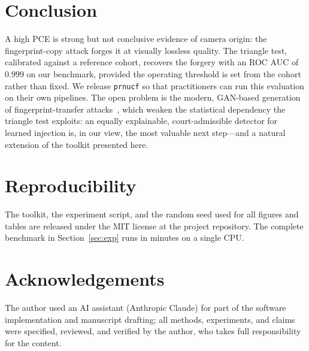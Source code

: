 \documentclass[11pt]{article}
\newcommand{\code}[1]{\texttt{#1}}
\begin{document}
\section{Conclusion}
A high PCE is strong but not conclusive evidence of camera origin: the
fingerprint-copy attack forges it at visually lossless quality. The triangle
test, calibrated against a reference cohort, recovers the forgery with an ROC AUC
of $0.999$ on our benchmark, provided the operating threshold is set from the
cohort rather than fixed. We release \code{prnucf} so that practitioners can run
this evaluation on their own pipelines. The open problem is the modern,
GAN-based generation of fingerprint-transfer attacks~\cite{cozzolino2021spoc,
prnutransfer2025}, which weaken the statistical dependency the triangle test
exploits: an equally explainable, court-admissible detector for learned
injection is, in our view, the most valuable next step---and a natural extension
of the toolkit presented here.

\section*{Reproducibility}
The toolkit, the experiment script, and the random seed used for all figures and
tables are released under the MIT license at the project repository. The complete
benchmark in Section~\ref{sec:exp} runs in minutes on a single CPU.

\section*{Acknowledgements}
The author used an AI assistant (Anthropic Claude) for part of the software
implementation and manuscript drafting; all methods, experiments, and claims were
specified, reviewed, and verified by the author, who takes full responsibility
for the content.
\end{document}
